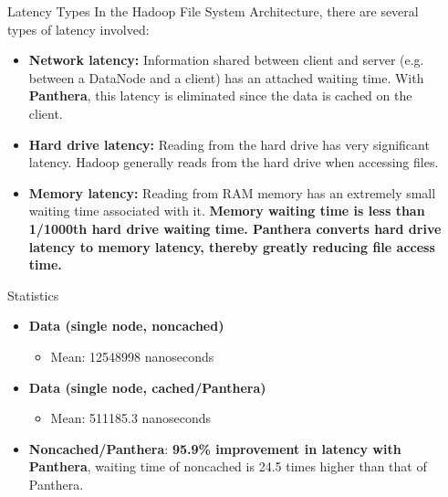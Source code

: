 \documentclass[final]{beamer} %
\begin{document}
\begin{frame}
\begin{columns}[t]
\begin{column}{0.32\textwidth}
	  
      \end{column}
      
      
      \begin{column}{0.32\textwidth}
      
	  \begin{block}{Latency Types}
		In the Hadoop File System Architecture, there are several types of latency involved:
		\begin{itemize}
		\item \textbf{Network latency: } Information shared between client and server (e.g. between a DataNode and a client) has an attached waiting time. With \textbf{Panthera}, this latency is eliminated since the data is cached on the client.
		\item \textbf{Hard drive latency: } Reading from the hard drive has very significant latency. Hadoop generally reads from the hard drive when accessing files.
		\item \textbf{Memory latency: } Reading from RAM memory has an extremely small
		waiting time associated with it. \textbf{Memory waiting time is less than 1/1000th hard drive waiting time. Panthera converts hard drive latency to memory latency, thereby greatly reducing file access time.}
		\end{itemize}
	  \end{block}
	  
    \begin{block}{Statistics}
    \begin{itemize}
    		\item \textbf{Data (single node, noncached)}
    		\begin{itemize}
    			\item Mean: 12548998 nanoseconds
    		\end{itemize}
    		\item \textbf{Data (single node, cached/Panthera)}
    		\begin{itemize}
    			\item Mean: 511185.3 nanoseconds
    		\end{itemize}
    		\item \textbf{Noncached/Panthera}: \textbf{95.9\% improvement in latency with Panthera}, waiting time of noncached is 24.5 times higher than that of Panthera.
    		

\end{itemize}
\end{block}
\end{column}
\end{columns}
\end{frame}
\end{document}
